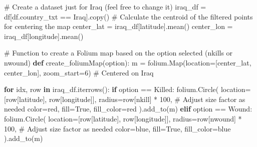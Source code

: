 \documentclass[
  letterpaper,
  DIV=11,
  numbers=noendperiod]{scrreprt}
\newenvironment{Shaded}{\begin{snugshade}}{\end{snugshade}}
\newcommand{\CommentTok}[1]{\textcolor[rgb]{0.37,0.37,0.37}{#1}}
\newcommand{\ControlFlowTok}[1]{\textcolor[rgb]{0.00,0.23,0.31}{\textbf{#1}}}
\newcommand{\DecValTok}[1]{\textcolor[rgb]{0.68,0.00,0.00}{#1}}
\newcommand{\KeywordTok}[1]{\textcolor[rgb]{0.00,0.23,0.31}{\textbf{#1}}}
\newcommand{\NormalTok}[1]{\textcolor[rgb]{0.00,0.23,0.31}{#1}}
\newcommand{\OperatorTok}[1]{\textcolor[rgb]{0.37,0.37,0.37}{#1}}
\newcommand{\StringTok}[1]{\textcolor[rgb]{0.13,0.47,0.30}{#1}}
\newcommand{\VariableTok}[1]{\textcolor[rgb]{0.07,0.07,0.07}{#1}}
\begin{document}
\begin{Shaded}
\begin{Highlighting}[]
\CommentTok{\# Create a dataset just for Iraq (feel free to change it)}
\NormalTok{iraq\_df }\OperatorTok{=}\NormalTok{ df[df.country\_txt }\OperatorTok{==} \StringTok{\textquotesingle{}Iraq\textquotesingle{}}\NormalTok{].copy()}
\CommentTok{\# Calculate the centroid of the filtered points for centering the map}
\NormalTok{center\_lat }\OperatorTok{=}\NormalTok{ iraq\_df[}\StringTok{\textquotesingle{}latitude\textquotesingle{}}\NormalTok{].mean()}
\NormalTok{center\_lon }\OperatorTok{=}\NormalTok{ iraq\_df[}\StringTok{\textquotesingle{}longitude\textquotesingle{}}\NormalTok{].mean()}

\CommentTok{\# Function to create a Folium map based on the option selected (nkills or nwound)}
\KeywordTok{def}\NormalTok{ create\_foliumMap(option):}
\NormalTok{    m }\OperatorTok{=}\NormalTok{ folium.Map(location}\OperatorTok{=}\NormalTok{[center\_lat, center\_lon], zoom\_start}\OperatorTok{=}\DecValTok{6}\NormalTok{)  }\CommentTok{\# Centered on Iraq}

    \ControlFlowTok{for}\NormalTok{ idx, row }\KeywordTok{in}\NormalTok{ iraq\_df.iterrows():}
        \ControlFlowTok{if}\NormalTok{ option }\OperatorTok{==} \StringTok{\textquotesingle{}Killed\textquotesingle{}}\NormalTok{:}
\NormalTok{            folium.Circle(}
\NormalTok{                location}\OperatorTok{=}\NormalTok{[row[}\StringTok{\textquotesingle{}latitude\textquotesingle{}}\NormalTok{], row[}\StringTok{\textquotesingle{}longitude\textquotesingle{}}\NormalTok{]],}
\NormalTok{                radius}\OperatorTok{=}\NormalTok{row[}\StringTok{\textquotesingle{}nkill\textquotesingle{}}\NormalTok{] }\OperatorTok{*} \DecValTok{100}\NormalTok{,  }\CommentTok{\# Adjust size factor as needed}
\NormalTok{                color}\OperatorTok{=}\StringTok{\textquotesingle{}red\textquotesingle{}}\NormalTok{,}
\NormalTok{                fill}\OperatorTok{=}\VariableTok{True}\NormalTok{,}
\NormalTok{                fill\_color}\OperatorTok{=}\StringTok{\textquotesingle{}red\textquotesingle{}}
\NormalTok{            ).add\_to(m)}
        \ControlFlowTok{elif}\NormalTok{ option }\OperatorTok{==} \StringTok{\textquotesingle{}Wound\textquotesingle{}}\NormalTok{:}
\NormalTok{            folium.Circle(}
\NormalTok{                location}\OperatorTok{=}\NormalTok{[row[}\StringTok{\textquotesingle{}latitude\textquotesingle{}}\NormalTok{], row[}\StringTok{\textquotesingle{}longitude\textquotesingle{}}\NormalTok{]],}
\NormalTok{                radius}\OperatorTok{=}\NormalTok{row[}\StringTok{\textquotesingle{}nwound\textquotesingle{}}\NormalTok{] }\OperatorTok{*} \DecValTok{100}\NormalTok{,  }\CommentTok{\# Adjust size factor as needed}
\NormalTok{                color}\OperatorTok{=}\StringTok{\textquotesingle{}blue\textquotesingle{}}\NormalTok{,}
\NormalTok{                fill}\OperatorTok{=}\VariableTok{True}\NormalTok{,}
\NormalTok{                fill\_color}\OperatorTok{=}\StringTok{\textquotesingle{}blue\textquotesingle{}}
\NormalTok{            ).add\_to(m)}


\end{Highlighting}
\end{Shaded}
\end{document}
